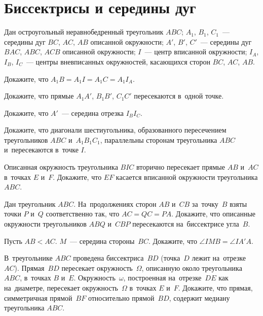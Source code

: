 
\section*{Биссектрисы и середины дуг}


Дан остроугольный неравнобедренный треугольник $ABC$;
$A_1$, $B_1$, $C_1$~— середины дуг $BC$, $AC$, $AB$ описанной окружности;
$A'$, $B'$, $C'$~— середины дуг $BAC$, $ABC$, $ACB$ описанной окружности;
$I$~— центр вписанной окружности;
$I_A$, $I_B$, $I_C$~— центры вневписанных окружностей, касающихся
сторон $BC$, $AC$, $AB$.

\begin{problems}

\item{}
Докажите, что
\(
    A_1 B = A_1 I = A_1 C = A_1 I_A
\).

\item
Докажите, что прямые $A_1 A'$, $B_1 B'$, $C_1 C'$ пересекаются в~одной точке.

\item
Докажите, что $A'$~— середина отрезка $I_B I_C$.

\item
Докажите, что диагонали шестиугольника, образованного пересечением
треугольников $ABC$ и~$A_1 B_1 C_1$, параллельны сторонам треугольника $ABC$
и~пересекаются в~точке $I$.

\item
Описанная окружность треугольника $BIC$ вторично пересекает прямые $AB$ и~$AC$
в~точках $E$ и~$F$.
Докажите, что $EF$ касается вписанной окружности треугольника $ABC$.

\item
Дан треугольник $ABC$.
На~продолжениях сторон $AB$ и~$CB$ за~точку~$B$ взяты точки $P$ и~$Q$
соответственно так, что $AC = QC = PA$.
Докажите, что описанные окружности треугольников $ABQ$ и~$CBP$ пересекаются
на~биссектрисе угла~$B$.

\item
Пусть $AB < AC$.
$M$~— середина стороны~$BC$.
Докажите, что $\angle {IMB} = \angle {IA'A}$.

\item
В~треугольнике $ABC$ проведена биссектриса~$BD$
(точка~$D$ лежит на~отрезке~$AC$).
Прямая~$BD$ пересекает окружность~$\Omega$, описанную около треугольника $ABC$,
в~точках $B$ и~$E$.
Окружность~$\omega$, построенная на~отрезке~$DE$ как на~диаметре, пересекает
окружность~$\Omega$ в~точках $E$ и~$F$.
Докажите, что прямая, симметричная прямой~$BF$ относительно прямой~$BD$,
содержит медиану треугольника $ABC$.


\end{problems}
